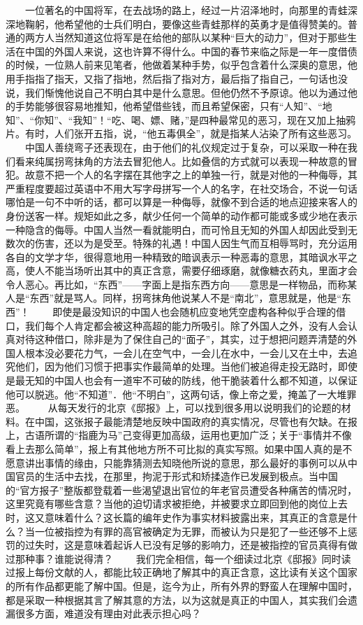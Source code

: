 \documentclass[12pt,oneside]{book}
\begin{document}
\begin{common-format}
　　一位著名的中国将军，在去战场的路上，经过一片沼泽地时，向那里的青蛙深深地鞠躬，他希望他的士兵们明白，要像这些青蛙那样的英勇才是值得赞美的。普通的两方人当然知道这位将军是在给他的部队以某种“巨大的动力”，但对于那些生活在中国的外国人来说，这也许算不得什么。中国的春节来临之际是一年一度借债的时候，一位熟人前来见笔者，他做着某种手势，似乎包含着什么深奥的意思，他用手指指了指天，又指了指地，然后指了指对方，最后指了指自己，一句话也没说，我们惭愧他说自己不明白其中是什么意思。但他仍然不予原谅。他以为通过他的手势能够很容易地推知，他希望借些钱，而且希望保密，只有“人知”、“地知”、“你知”、“我知”！“吃、喝、嫖、赌，”是四种最常见的恶习，现在又加上抽鸦片。有时，人们张开五指，说，“他五毒俱全”，就是指某人沾染了所有这些恶习。 
　　中国人善绕弯子还表现在，由于他们的礼仪规定过于复杂，可以采取一种在我们看来纯属拐弯抹角的方法去冒犯他人。比如叠信的方式就可以表现一种故意的冒犯。故意不把一个人的名字摆在其他字之上的单独一行，就是对他的一种侮辱，其严重程度要超过英语中不用大写字母拼写一个人的名字，在社交场合，不说一句话哪怕是一句不中听的话，都可以算是一种侮辱，就像不到合适的地点迎接来客人的身份送客一样。规矩如此之多，献少任何一个简单的动作都可能或多或少地在表示一种隐含的侮辱。中国人当然一看就能明白，而可怜且无知的外国人却因此受到无数次的伤害，还以为是受至。特殊的礼遇！中国人因生气而互相辱骂时，充分运用各自的文学才华，很得意地用一种精致的暗讽表示一种恶毒的意思，其暗讽水平之高，使人不能当场听出其中的真正含意，需要仔细琢磨，就像糖衣药丸，里面才会令人恶心。再比如，“东西”——字面上是指东西方向——意思是一样物品，而称某人是“东西”就是骂人。同样，拐弯抹角他说某人不是“南北”，意思就是，他是“东西”！ 
　　即使是最没知识的中国人也会随机应变地凭空虚构各种似乎合理的借口，我们每个人肯定都会被这种高超的能力所吸引。除了外国人之外，没有人会认真对待这种借口，除非是为了保住自己的“面子”，其实，过于想把问题弄清楚的外国人根本没必要花力气，一会儿在空气中，一会儿在水中，一会儿又在土中，去追究他们，因为他们习惯于把事实作最简单的处理。当他们被追得走投无路时，即使是最无知的中国人也会有一道牢不可破的防线，他干脆装着什么都不知道，以保证他可以脱逃。他“不知道”．他“不明白”，这两句话，像上帝之爱，掩盖了一大堆罪恶。 
　　从每天发行的北京《邸报》上，可以找到很多用以说明我们的论题的材料。在中国，这张报子最能清楚地反映中国政府的真实情况，尽管也有欠缺。在报上，古语所谓的“指鹿为马”己变得更加高级，运用也更加广泛；关于“事情并不像看上去那么简单”，报上有其他地方所不可比拟的真实写照。如果中国人真的是不愿意讲出事情的缘由，只能靠猜测去知晓他所说的意思，那么最好的事例可以从中国官员的生活中去找，在那里，拘泥于形式和矫揉造作已发展到极点。当中国的“官方报子”整版都登载着一些渴望退出官位的年老官员遭受各种痛苦的情况时，这里究竟有哪些含意？当他的迫切请求被拒绝，并被要求立即回到他的岗位上去时，这又意味着什么？这长篇的编年史作为事实材料披露出来，其真正的含意是什么？当一位被指控为有罪的高官被确定为无罪，而被认为只是犯了一些还够不上惩罚的过失时，这是意味着起诉人已没有足够的影响力，还是被指控的官员真得有做过那种事？谁能说得清？ 
　　我们完全相信，每一个细读过北京《邸报》同时读过报上每份文献的人，都能比较正确地了解其中的真正含意，这比读有关这个国家的所有作品都更能了解中国。但是，迄今为止，所有外界的野蛮人在理解中国时，都是采取一种根据其言了解其意的方法，以为这就是真正的中国人，其实我们会遗漏很多方面，难道没有理由对此表示担心吗？ 




\end{common-format}
\end{document}
